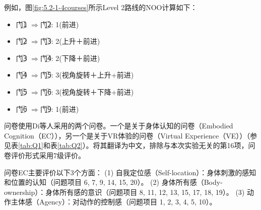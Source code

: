 例如，图\ref{fig:5.2-1-4courses}所示Level 2路线的NOO计算如下：

\begin{itemize}
    \item 门\textcircled{1} $\Rightarrow$门\textcircled{2}: 1(前进)
    \item 门\textcircled{2} $\Rightarrow$门\textcircled{3}: 2(上升＋前进)
    \item 门\textcircled{3} $\Rightarrow$门\textcircled{4}: 2(下降＋前进)
    \item 门\textcircled{4} $\Rightarrow$门\textcircled{5}: 3(视角旋转＋上升+前进)
    \item 门\textcircled{5} $\Rightarrow$门\textcircled{6}: 3(视角旋转＋下降+前进)
    \item 门\textcircled{6} $\Rightarrow$门\textcircled{9}: 1(前进)
\end{itemize}

问卷使用Di等人\cite{di2022natural}采用的两个问卷。一个是关于身体认知的问卷（Embodied Cognition（EC）），另一个是关于VR体验的问卷（Virtual Experience（VE））（参见表\ref{tab:Q1}和表\ref{tab:Q2}）。将其翻译为中文，排除与本次实验无关的第16项，问卷评价形式采用7级评价。

问卷EC主要评价以下3个方面：
(1) 自我定位感（Self-location）：身体刺激的感知和位置的认知（问题项目 6, 7, 9, 14, 15, 20）。
(2) 身体所有感（Body-ownership）：身体所有感的意识（问题项目 8, 11, 12, 13, 15, 17, 18, 19）。
(3) 动作主体感（Agency）：对动作的控制感（问题项目 1, 2, 3, 4, 5, 10）。

